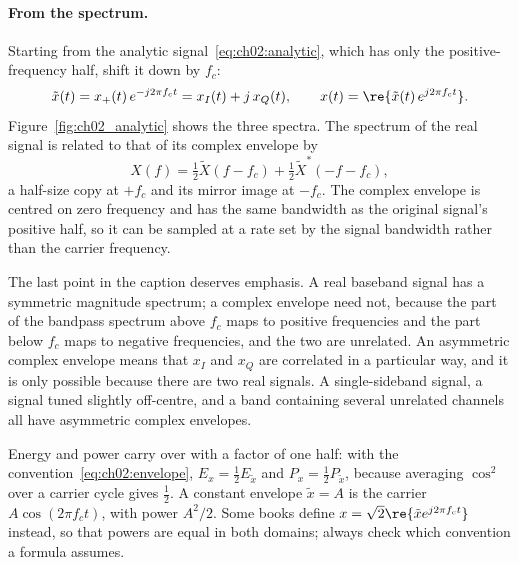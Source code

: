 \paragraph{From the spectrum.} Starting from the analytic signal~\eqref{eq:ch02:analytic}, which has
only the positive-frequency half, shift it down by $f_c$:
\begin{equation}
\tilde{x}(t)=x_+(t)\,e^{-j2\pi f_c t}=x_I(t)+j\,x_Q(t),\qquad
x(t)=\re\{\tilde{x}(t)\,e^{j2\pi f_c t}\}.
\label{eq:ch02:envelope}
\end{equation}
Figure~\ref{fig:ch02_analytic} shows the three spectra. The spectrum of the real signal is related
to that of its complex envelope by
\begin{equation}
X(f)=\tfrac12\tilde X(f-f_c)+\tfrac12\tilde X^*(-f-f_c),
\label{eq:ch02:envspec}
\end{equation}
a half-size copy at $+f_c$ and its mirror image at $-f_c$. The complex envelope is centred on zero
frequency and has the same bandwidth as the original signal's positive half, so it can be sampled
at a rate set by the signal bandwidth rather than the carrier frequency.

The last point in the caption deserves emphasis. A real baseband signal has a symmetric
magnitude spectrum; a complex envelope need not, because the part of the bandpass spectrum above
$f_c$ maps to positive frequencies and the part below $f_c$ maps to negative frequencies, and the two
are unrelated. An asymmetric complex envelope means that $x_I$ and $x_Q$ are correlated in a
particular way, and it is only possible because there are two real signals. A single-sideband
signal, a signal tuned slightly off-centre, and a band containing several unrelated channels all
have asymmetric complex envelopes.

Energy and power carry over with a factor of one half: with the convention~\eqref{eq:ch02:envelope},
$E_x=\tfrac12E_{\tilde x}$ and $P_x=\tfrac12P_{\tilde x}$, because averaging $\cos^2$ over a carrier
cycle gives $\tfrac12$. A constant envelope $\tilde x=A$ is the carrier $A\cos(2\pi f_ct)$, with
power $A^2/2$. Some books define $x=\sqrt2\re\{\tilde xe^{j2\pi f_ct}\}$ instead, so that powers are
equal in both domains; always check which convention a formula assumes.


